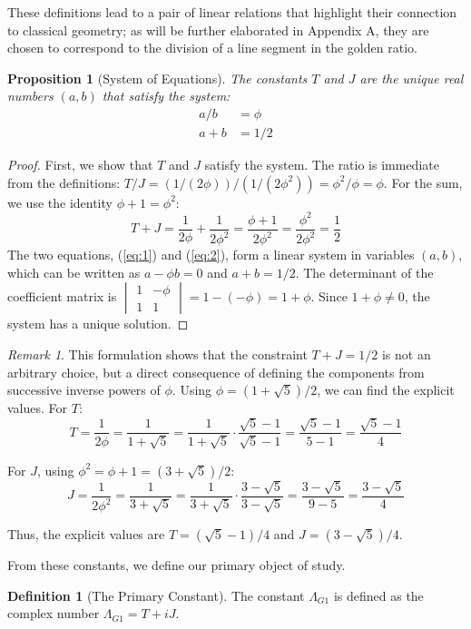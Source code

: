 \documentclass{amsart}
\theoremstyle{plain}
\newtheorem{proposition}[theorem]{Proposition}
\theoremstyle{definition}
\newtheorem{definition}[theorem]{Definition}
\theoremstyle{remark}
\newtheorem*{remark}{Remark}
\newcommand{\LambdaG}{\Lambda_{G1}}
\newcommand{\phiG}{\phi}
\begin{document}
These definitions lead to a pair of linear relations that highlight their connection to classical geometry; as will be further elaborated in Appendix A, they are chosen to correspond to the division of a line segment in the golden ratio.
\begin{proposition}[System of Equations]
The constants $T$ and $J$ are the unique real numbers $(a,b)$ that satisfy the system:
\begin{align}
    a/b &= \phiG \label{eq:1} \\
    a+b &= 1/2 \label{eq:2}
\end{align}
\end{proposition}
\begin{proof}
First, we show that $T$ and $J$ satisfy the system. The ratio is immediate from the definitions: $T/J = (1/(2\phiG))/(1/(2\phiG^2)) = \phiG^2/\phiG = \phiG$. For the sum, we use the identity $\phiG+1 = \phiG^2$:
\[ T+J = \frac{1}{2\phiG} + \frac{1}{2\phiG^2} = \frac{\phiG+1}{2\phiG^2} = \frac{\phiG^2}{2\phiG^2} = \frac{1}{2} \]
The two equations, (\ref{eq:1}) and (\ref{eq:2}), form a linear system in variables $(a,b)$, which can be written as $a - \phiG b = 0$ and $a+b=1/2$. The determinant of the coefficient matrix is $\begin{vmatrix} 1 & -\phiG \\ 1 & 1 \end{vmatrix} = 1 - (-\phiG) = 1+\phiG$. Since $1+\phiG \neq 0$, the system has a unique solution.
\end{proof}

\begin{remark}
This formulation shows that the constraint $T+J=1/2$ is not an arbitrary choice, but a direct consequence of defining the components from successive inverse powers of $\phiG$. Using $\phiG = (1+\sqrt{5})/2$, we can find the explicit values. For $T$:
\[ T = \frac{1}{2\phiG} = \frac{1}{1+\sqrt{5}} = \frac{1}{1+\sqrt{5}} \cdot \frac{\sqrt{5}-1}{\sqrt{5}-1} = \frac{\sqrt{5}-1}{5-1} = \frac{\sqrt{5}-1}{4} \]

For $J$, using $\phiG^2 = \phiG+1 = (3+\sqrt{5})/2$:
\[ J = \frac{1}{2\phiG^2} = \frac{1}{3+\sqrt{5}} = \frac{1}{3+\sqrt{5}} \cdot \frac{3-\sqrt{5}}{3-\sqrt{5}} = \frac{3-\sqrt{5}}{9-5} = \frac{3-\sqrt{5}}{4} \]

Thus, the explicit values are $T = (\sqrt{5}-1)/4$ and $J = (3-\sqrt{5})/4$.
\end{remark}

From these constants, we define our primary object of study.
\begin{definition}[The Primary Constant]
The constant $\LambdaG$ is defined as the complex number $\LambdaG = T+iJ$.
\end{definition}
\end{document}
